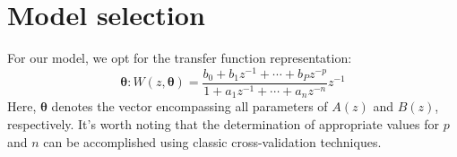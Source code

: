 \section{Model selection}

For our model, we opt for the transfer function representation:
\[\mathcal{\boldsymbol{\theta}}:W(z,\boldsymbol{\theta})=\dfrac{b_0+b_1z^{-1}+\cdots+b_Pz^{-p}}{1+a_1z^{-1}+\cdots+a_nz^{-n}}z^{-1}\]
Here, $\boldsymbol{\theta}$ denotes the vector encompassing all parameters of $A(z)$ and $B(z)$, respectively.
It's worth noting that the determination of appropriate values for $p$ and $n$ can be accomplished using classic cross-validation techniques.